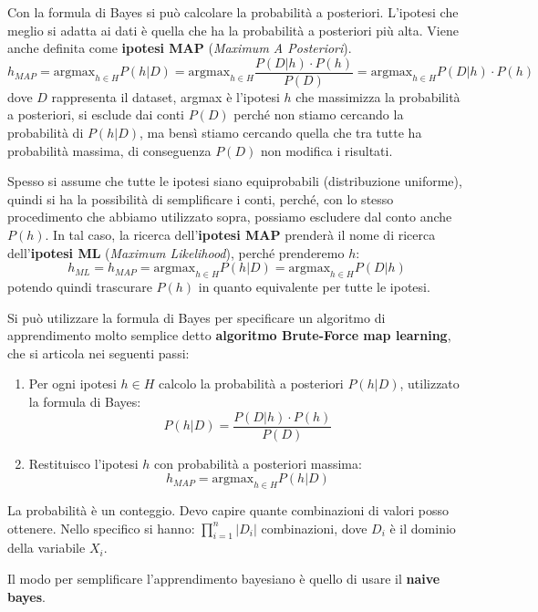 Con la formula di Bayes si può calcolare la probabilità a posteriori. L'ipotesi
che meglio si adatta ai dati è quella che ha la probabilità a posteriori più alta.
Viene anche definita come \textbf{ipotesi MAP} (\textit{Maximum A Posteriori}).
\begin{equation}
    h_{MAP} = \text{argmax}_{h \in H} P(h|D) = \text{argmax}_{h \in H} \frac{P(D|h)
        \cdot P(h)}{P(D)} = \text{argmax}_{h \in H} P(D|h) \cdot P(h)
\end{equation}
dove $D$ rappresenta il dataset, argmax è l'ipotesi $h$ che massimizza la probabilità
a posteriori, si esclude dai conti $P(D)$ perché non stiamo cercando la probabilità
di $P(h|D)$, ma bensì stiamo cercando quella che tra tutte ha probabilità massima,
di conseguenza $P(D)$ non modifica i risultati.

Spesso si assume che tutte le ipotesi siano equiprobabili (distribuzione uniforme),
quindi si ha la possibilità di semplificare i conti, perché, con lo stesso
procedimento che abbiamo utilizzato sopra, possiamo escludere dal conto anche $P(h)$.
In tal caso, la ricerca dell'\textbf{ipotesi MAP} prenderà il nome di ricerca
dell'\textbf{ipotesi ML} (\textit{Maximum Likelihood}), perché prenderemo $h$:
\begin{equation}
    h_{ML} = h_{MAP} =\text{argmax}_{h \in H} P(h|D) =\text{argmax}_{h \in H} P(D|h)
\end{equation}
potendo quindi trascurare $P(h)$ in quanto equivalente per tutte le ipotesi.

Si può utilizzare la formula di Bayes per specificare un algoritmo di apprendimento
molto semplice detto \textbf{algoritmo Brute-Force map learning}, che si articola
nei seguenti passi:
\begin{enumerate}
    \item Per ogni ipotesi $h \in H$ calcolo la probabilità a posteriori $P(h|D)$,
          utilizzato la formula di Bayes:
          \begin{equation}
              P(h|D) = \frac{P(D|h) \cdot P(h)}{P(D)}
          \end{equation}
    \item Restituisco l'ipotesi $h$ con probabilità a posteriori massima:
          \begin{equation}
              h_{MAP} = \text{argmax}_{h \in H} P(h|D)
          \end{equation}
\end{enumerate}
\begin{nota}
    La probabilità è un conteggio. Devo capire quante combinazioni di valori posso
    ottenere. Nello specifico si hanno: $\prod_{i=1}^n |D_i|$ combinazioni, dove
    $D_i$ è il dominio della variabile $X_i$.
\end{nota}
Il modo per semplificare l'apprendimento bayesiano è quello di usare il \textbf{naive bayes}.

